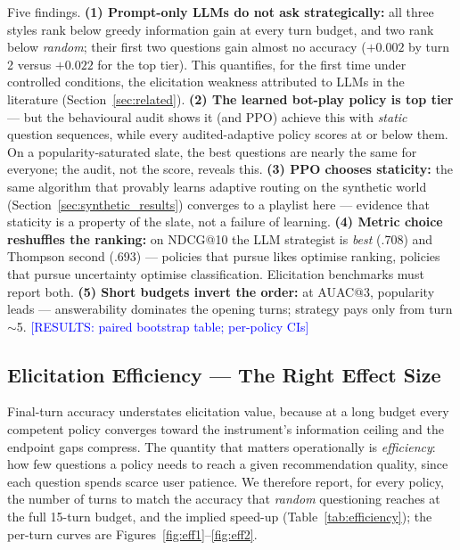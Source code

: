 \documentclass[11pt]{article}
\newcommand{\results}[1]{\textcolor{blue}{[RESULTS: #1]}}
\begin{document}
Five findings. \textbf{(1) Prompt-only LLMs do not ask strategically:}
all three styles rank below greedy information gain at every turn budget,
and two rank below \emph{random}; their first two questions gain almost
no accuracy ($+0.002$ by turn 2 versus $+0.022$ for the top tier). This
quantifies, for the first time under controlled conditions, the
elicitation weakness attributed to LLMs in the literature
(Section~\ref{sec:related}). \textbf{(2) The learned bot-play policy is
top tier} --- but the behavioural audit shows it (and PPO) achieve this
with \emph{static} question sequences, while every audited-adaptive
policy scores at or below them. On a popularity-saturated slate, the
best questions are nearly the same for everyone; the audit, not the
score, reveals this. \textbf{(3) PPO chooses staticity:} the same
algorithm that provably learns adaptive routing on the synthetic world
(Section~\ref{sec:synthetic_results}) converges to a playlist here ---
evidence that staticity is a property of the slate, not a failure of
learning. \textbf{(4) Metric choice reshuffles the ranking:} on NDCG@10
the LLM strategist is \emph{best} (.708) and Thompson second (.693) ---
policies that pursue likes optimise ranking, policies that pursue
uncertainty optimise classification. Elicitation benchmarks must report
both. \textbf{(5) Short budgets invert the order:} at AUAC@3, popularity
leads --- answerability dominates the opening turns; strategy pays only
from turn $\sim$5. \results{paired bootstrap table; per-policy CIs}

\subsection{Elicitation Efficiency --- The Right Effect Size}
\label{sec:efficiency}

Final-turn accuracy understates elicitation value, because at a long
budget every competent policy converges toward the instrument's
information ceiling and the endpoint gaps compress. The quantity that
matters operationally is \emph{efficiency}: how few questions a policy
needs to reach a given recommendation quality, since each question spends
scarce user patience. We therefore report, for every policy, the number
of turns to match the accuracy that \emph{random} questioning reaches at
the full 15-turn budget, and the implied speed-up
(Table~\ref{tab:efficiency}); the per-turn curves are
Figures~\ref{fig:eff1}--\ref{fig:eff2}.
\end{document}
